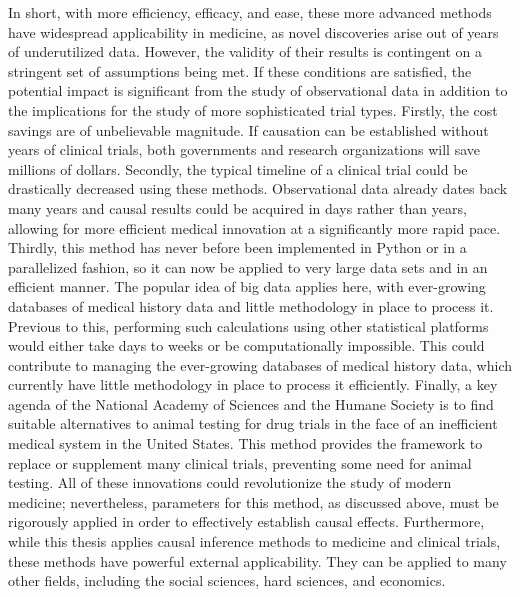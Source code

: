 In short, with more efficiency, efficacy, and ease, these more advanced methods have widespread applicability in medicine, as novel discoveries arise out of years of underutilized data.  However, the validity of their results is contingent on a stringent set of assumptions being met.  If these conditions are satisfied, the potential impact is significant from the study of observational data in addition to the implications for the study of more sophisticated trial types.  Firstly, the cost savings are of unbelievable magnitude.  If causation can be established without years of clinical trials, both governments and research organizations will save millions of dollars.  Secondly, the typical timeline of a clinical trial could be drastically decreased using these methods.  Observational data already dates back many years and causal results could be acquired in days rather than years, allowing for more efficient medical innovation at a significantly more rapid pace.  Thirdly, this method has never before been implemented in Python or in a parallelized fashion, so it can now be applied to very large data sets and in an efficient manner.  The popular idea of big data applies here, with ever-growing databases of medical history data and little methodology in place to process it.  Previous to this, performing such calculations using other statistical platforms would either take days to weeks or be computationally impossible. This could contribute to managing the ever-growing databases of medical history data, which currently have little methodology in place to process it efficiently.  Finally, a key agenda of the National Academy of Sciences and the Humane Society is to find suitable alternatives to animal testing for drug trials in the face of an inefficient medical system in the United States.\cite{avoidinganimaltesting, dzauvital}   This method provides the framework to replace or supplement many clinical trials, preventing some need for animal testing.  All of these innovations could revolutionize the study of modern medicine; nevertheless, parameters for this method, as discussed above, must be rigorously applied in order to effectively establish causal effects.  Furthermore, while this thesis applies causal inference methods to medicine and clinical trials, these methods have powerful external applicability. They can be applied to many other fields, including the social sciences, hard sciences, and economics.  



